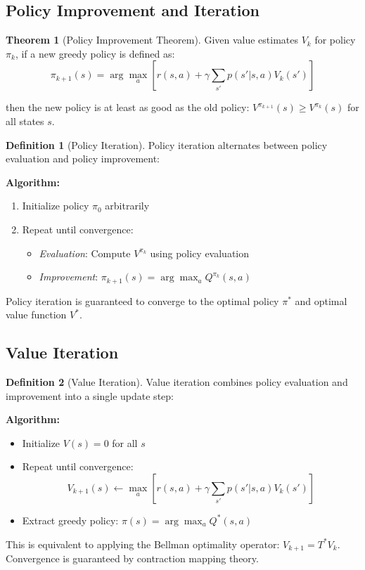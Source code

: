 \documentclass[12pt,a4paper]{article}
\theoremstyle{definition}
\newtheorem{definition}{Definition}[section]
\newtheorem{theorem}{Theorem}[section]
\begin{document}
\subsection{Policy Improvement and Iteration}

\begin{theorem}[Policy Improvement Theorem]
Given value estimates $V_k$ for policy $\pi_k$, if a new greedy policy is defined as:
\[
\pi_{k+1}(s) = \arg\max_a \left[ r(s, a) + \gamma \sum_{s'} p(s' | s, a) V_k(s') \right]
\]

then the new policy is at least as good as the old policy: $V^{\pi_{k+1}}(s) \geq V^{\pi_k}(s)$ for all states $s$.
\end{theorem}

\begin{definition}[Policy Iteration]
Policy iteration alternates between policy evaluation and policy improvement:

\textbf{Algorithm:}
\begin{enumerate}
    \item Initialize policy $\pi_0$ arbitrarily
    \item Repeat until convergence:
    \begin{itemize}
        \item \textit{Evaluation}: Compute $V^{\pi_k}$ using policy evaluation
        \item \textit{Improvement}: $\pi_{k+1}(s) = \arg\max_a Q^{\pi_k}(s, a)$
    \end{itemize}
\end{enumerate}

Policy iteration is guaranteed to converge to the optimal policy $\pi^*$ and optimal value function $V^*$.
\end{definition}

\subsection{Value Iteration}

\begin{definition}[Value Iteration]
Value iteration combines policy evaluation and improvement into a single update step:

\textbf{Algorithm:}
\begin{itemize}
    \item Initialize $V(s) = 0$ for all $s$
    \item Repeat until convergence:
    \[
    V_{k+1}(s) \leftarrow \max_a \left[ r(s, a) + \gamma \sum_{s'} p(s' | s, a) V_k(s') \right]
    \]
    \item Extract greedy policy: $\pi(s) = \arg\max_a Q^*(s, a)$
\end{itemize}

This is equivalent to applying the Bellman optimality operator: $V_{k+1} = T^* V_k$. Convergence is guaranteed by contraction mapping theory.
\end{definition}
\end{document}
